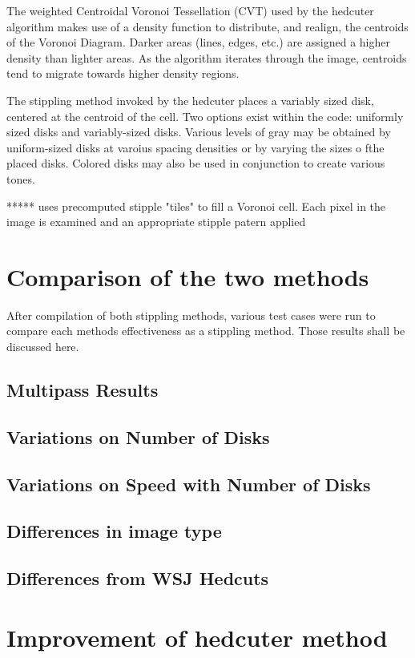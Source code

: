 \documentclass[11pt]{article}
\begin{document}
The weighted Centroidal Voronoi Tessellation (CVT) used by the hedcuter algorithm makes use of a density function to distribute, and realign, the centroids of the Voronoi Diagram. Darker areas (lines, edges, etc.) are assigned a higher density than lighter areas. As the algorithm iterates through the image, centroids tend to migrate towards higher density regions.

The stippling method invoked by the hedcuter places a variably sized disk, centered at the centroid of the cell. Two options exist within the code: uniformly sized disks and variably-sized disks. Various levels of gray may be obtained by uniform-sized disks at varoius spacing densities or by varying the sizes o fthe placed disks. Colored disks may also be used in conjunction to create various tones. \cite{Secord:2002:WVS:508530.508537}

***** uses precomputed stipple "tiles" to fill a Voronoi cell. Each pixel in the image is examined and an appropriate stipple patern applied 

\section{Comparison of the two methods}
After compilation of both stippling methods, various test cases were run to compare each methods effectiveness as a stippling method. Those results shall be discussed here.

\subsection{Multipass Results}

\subsection{Variations on Number of Disks}

\subsection{Variations on Speed with Number of Disks}

\subsection{Differences in image type}

\subsection{Differences from WSJ Hedcuts}

\section{Improvement of hedcuter method}



\end{document}
